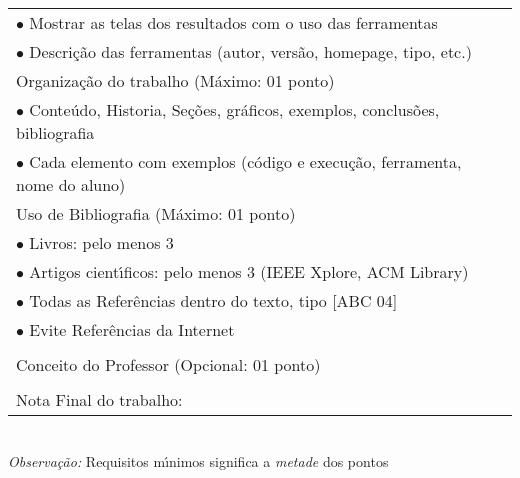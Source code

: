 \begin{tabular}{|p{12cm}|c|}
  $\bullet$ Mostrar as telas dos resultados com o uso das ferramentas &  \\
  $\bullet$ Descri\c{c}\~{a}o das ferramentas (autor, vers\~{a}o, homepage, tipo, etc.) &  \\
  \hline
  \color{red} Organiza\c{c}\~{a}o do trabalho (M\'{a}ximo: 01 ponto) &  \\
  $\bullet$ Conte\'{u}do, Historia, Se\c{c}\~{o}es, gr\'{a}ficos, exemplos, conclus\~{o}es, bibliografia &  \\
  $\bullet$ Cada elemento com exemplos (c\'{o}digo e execu\c{c}\~{a}o, ferramenta, nome do aluno) &  \\
  \hline
  \color{red} Uso de Bibliografia (M\'{a}ximo: 01 ponto)&  \\
   $\bullet$ Livros: pelo menos 3&  \\
   $\bullet$ Artigos cient\'{\i}ficos: pelo menos 3 (IEEE Xplore, ACM Library)&  \\
   $\bullet$ Todas as Refer\^{e}ncias dentro do texto, tipo [ABC 04] & \\
   $\bullet$ Evite Refer\^{e}ncias da Internet & \\
   \hline
     &  \\
  \color{red} Conceito do Professor (Opcional: 01 ponto) & \\
  \hline
   & \\
  \hfill \color{blue} Nota Final do trabalho: & \\
  \hline
\end{tabular}\\
\textit{Observa\c{c}\~{a}o:} Requisitos m\'{\i}nimos significa a \textit{metade} dos pontos
